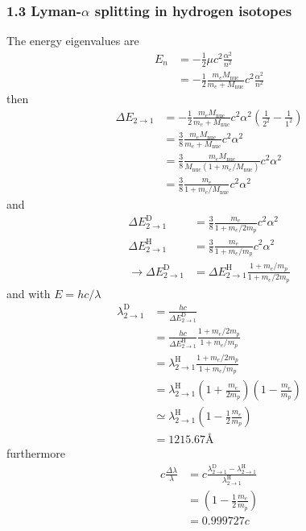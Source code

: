 \documentclass[10pt,a4paper]{article}
\theoremstyle{definition}
\begin{document}
\subsubsection{1.3 Lyman-$\alpha$ splitting in hydrogen isotopes}
The energy eigenvalues are
\begin{align}
E_n
&=-\frac{1}{2}\mu c^2\frac{\alpha^2}{n^2}\\
&=-\frac{1}{2}\frac{m_eM_\text{nuc}}{m_e+M_\text{nuc}} c^2\frac{\alpha^2}{n^2}
\end{align}
then
\begin{align}
\Delta E_{2\rightarrow1}
&=-\frac{1}{2}\frac{m_eM_\text{nuc}}{m_e+M_\text{nuc}} c^2\alpha^2\left(\frac{1}{2^2}-\frac{1}{1^2}\right)\\
&=\frac{3}{8}\frac{m_eM_\text{nuc}}{m_e+M_\text{nuc}} c^2\alpha^2\\
&=\frac{3}{8}\frac{m_eM_\text{nuc}}{M_\text{nuc}(1+m_e/M_\text{nuc})} c^2\alpha^2\\
&=\frac{3}{8}\frac{m_e}{1+m_e/M_\text{nuc}} c^2\alpha^2
\end{align}
and
\begin{align}
\Delta E^\text{D}_{2\rightarrow1}
&=\frac{3}{8}\frac{m_e}{1+m_e/2m_p} c^2\alpha^2\\
\Delta E^\text{H}_{2\rightarrow1}
&=\frac{3}{8}\frac{m_e}{1+m_e/m_p} c^2\alpha^2\\
\rightarrow \Delta E^\text{D}_{2\rightarrow1}&= \Delta E^\text{H}_{2\rightarrow1}\frac{1+m_e/m_p}{1+m_e/2m_p}
\end{align}
and with $E=hc/\lambda$
\begin{align}
\lambda^\text{D}_{2\rightarrow1}&=\frac{hc}{\Delta E^\text{D}_{2\rightarrow1}}\\
&=\frac{hc}{\Delta E^\text{H}_{2\rightarrow1}}\frac{1+m_e/2m_p}{1+m_e/m_p}\\
&=\lambda^\text{H}_{2\rightarrow1}\frac{1+m_e/2m_p}{1+m_e/m_p}\\
&=\lambda^\text{H}_{2\rightarrow1}\left(1+\frac{m_e}{2m_p}\right)\left(1-\frac{m_e}{m_p}\right)\\
&\simeq\lambda^\text{H}_{2\rightarrow1}\left(1-\frac{1}{2}\frac{m_e}{m_p}\right)\\
&=1215.67\text{\AA}
\end{align}
furthermore
\begin{align}
c\frac{\Delta\lambda}{\lambda}&=
c\frac{\lambda^\text{D}_{2\rightarrow1}-\lambda^\text{H}_{2\rightarrow1}}{\lambda^\text{H}_{2\rightarrow1}}\\
&=\left(1-\frac{1}{2}\frac{m_e}{m_p}\right)\\
&=0.999727c
\end{align}
\end{document}
